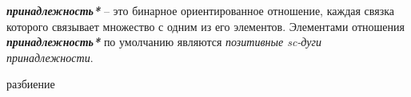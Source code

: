 \begin{SCn}
\end{SCn}

\textbf{\textit{принадлежность*}} – это бинарное ориентированное отношение, каждая связка которого связывает множество с одним из его элементов. Элементами отношения \textbf{\textit{принадлежность*}} по умолчанию являются \textit{позитивные sc-дуги принадлежности}.




	
\begin{SCn}
\begin{scnrelfromset}{разбиение}
\end{scnrelfromset}
\end{SCn}

